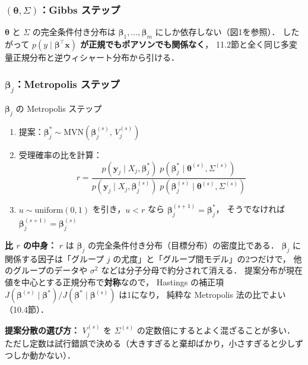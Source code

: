 \documentclass[lualatex,ja=standard,a4paper,12pt]{bxjsarticle}
\newcommand{\mvn}{\mathrm{MVN}}
\begin{document}
\subsubsection*{$(\bm{\theta}, \Sigma)$：Gibbs ステップ}

$\bm{\theta}$ と $\Sigma$ の完全条件付き分布は $\bm{\beta}_1, \ldots, \bm{\beta}_m$ にしか依存しない（図1を参照）．
したがって \textbf{$p(y \mid \bm{\beta}^\top\bm{x})$ が正規でもポアソンでも関係なく}，
11.2節と全く同じ多変量正規分布と逆ウィシャート分布から引ける．

\subsubsection*{$\bm{\beta}_j$：Metropolis ステップ}

\begin{algobox}{$\bm{\beta}_j$ の Metropolis ステップ}
\begin{enumerate}
  \item 提案：$\bm{\beta}_j^* \sim \mvn(\bm{\beta}_j^{(s)},\, V_j^{(s)})$
  \item 受理確率の比を計算：
  \[
    r = \frac{p(\bm{y}_j \mid X_j, \bm{\beta}_j^*)\; p(\bm{\beta}_j^* \mid \bm{\theta}^{(s)}, \Sigma^{(s)})}
             {p(\bm{y}_j \mid X_j, \bm{\beta}_j^{(s)})\; p(\bm{\beta}_j^{(s)} \mid \bm{\theta}^{(s)}, \Sigma^{(s)})}
  \]
  \item $u \sim \mathrm{uniform}(0,1)$ を引き，$u < r$ なら $\bm{\beta}_j^{(s+1)} = \bm{\beta}_j^*$，
        そうでなければ $\bm{\beta}_j^{(s+1)} = \bm{\beta}_j^{(s)}$
\end{enumerate}
\end{algobox}

\begin{pointbox}
\textbf{比 $r$ の中身：}
$r$ は $\bm{\beta}_j$ の完全条件付き分布（目標分布）の密度比である．
$\bm{\beta}_j$ に関係する因子は「グループ $j$ の尤度」と「グループ間モデル」の2つだけで，
他のグループのデータや $\sigma^2$ などは分子分母で約分されて消える．
提案分布が現在値を中心とする正規分布で\textbf{対称}なので，
Hastings の補正項 $J(\bm{\beta}^{(s)} \mid \bm{\beta}^*)/J(\bm{\beta}^* \mid \bm{\beta}^{(s)})$ は1になり，
純粋な Metropolis 法の比でよい（10.4節）．

\medskip
\textbf{提案分散の選び方：}
$V_j^{(s)}$ を $\Sigma^{(s)}$ の定数倍にするとよく混ざることが多い．
ただし定数は試行錯誤で決める（大きすぎると棄却ばかり，小さすぎると少しずつしか動かない）．
\end{pointbox}
\end{document}
